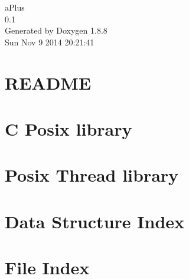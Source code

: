 \documentclass[twoside]{book}
\newcommand{\+}{\discretionary{\mbox{\scriptsize$\hookleftarrow$}}{}{}}
\newcommand{\clearemptydoublepage}{%
  \newpage{\pagestyle{empty}\cleardoublepage}%
}
\begin{document}
\hypersetup{pageanchor=false,
             bookmarks=true,
             bookmarksnumbered=true,
             pdfencoding=unicode
            }
\begin{titlepage}
\vspace*{7cm}
\begin{center}%
{\Large a\+Plus \\[1ex]\large 0.\+1 }\\
\vspace*{1cm}
{\large Generated by Doxygen 1.8.8}\\
\vspace*{0.5cm}
{\small Sun Nov 9 2014 20:21:41}\\
\end{center}
\end{titlepage}
\clearemptydoublepage
\tableofcontents
\clearemptydoublepage
{}
\hypersetup{pageanchor=true}

\chapter{R\+E\+A\+D\+M\+E}
\label{md_README}
\hypertarget{md_README}{}

\chapter{C Posix library}
\label{md_usr_src_libposix_README}
\hypertarget{md_usr_src_libposix_README}{}

\chapter{Posix Thread library}
\label{md_usr_src_libpthread_README}
\hypertarget{md_usr_src_libpthread_README}{}

\chapter{Data Structure Index}

\chapter{File Index}

\end{document}

